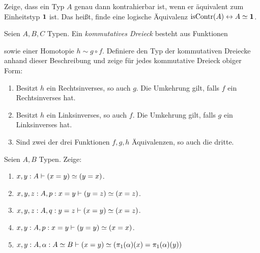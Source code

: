 \documentclass{uebung}
\begin{document}

\begin{exercise}
  Zeige, dass ein Typ $A$ genau dann kontrahierbar ist, wenn er äquivalent zum Einheitstyp $\mathbf{1}$ ist.
  Das heißt, finde eine logische Äquivalenz $\mathrm{isContr}(A)\leftrightarrow A\simeq\mathbf{1}$.
\end{exercise}

\begin{exercise}
  Seien $A,B,C$ Typen.
  Ein \emph{kommutatives Dreieck} besteht aus Funktionen
  \begin{center}
  \end{center}
  sowie einer Homotopie $h\sim g\circ f$.
  Definiere den Typ der kommutativen Dreiecke anhand dieser Beschreibung und zeige für jedes kommutative Dreieck obiger Form:
  \begin{enumerate}
    \item Besitzt $h$ ein Rechtsinverses, so auch $g$.
      Die Umkehrung gilt, falls $f$ ein Rechtsinverses hat.
    \item Besitzt $h$ ein Linksinverses, so auch $f$.
      Die Umkehrung gilt, falls $g$ ein Linksinverses hat.
    \item Sind zwei der drei Funktionen $f,g,h$ Äquivalenzen, so auch die dritte.
  \end{enumerate}
\end{exercise}

\begin{exercise}[Äquivalenzen I]
  Seien $A,B$ Typen.
  Zeige:
    \begin{enumerate}
      \item $x,y:A \vdash (x=y) \simeq (y=x)$.
      \item $x,y,z:A,p:x=y \vdash (y=z) \simeq (x=z)$.
      \item $x,y,z:A,q:y=z \vdash (x=y) \simeq (x=z)$.
      \item $x,y:A,p:x=y \vdash (y=y) \simeq (x=x)$.
      \item ${x,y:A, \alpha:A\simeq B \vdash (x=y) \simeq (\pi_1(\alpha)(x)=\pi_1(\alpha)(y))}$
    \end{enumerate}
\end{exercise}
\end{document}
